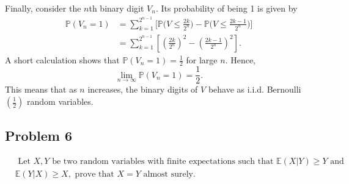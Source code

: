 \documentclass[letterpaper, 11pt]{article}
\newcommand{\1}{\mathds{1}}	%
\theoremstyle{definition}
\begin{document}
Finally, consider the \(n\)th binary digit \(V_n\). Its probability of being 1 is given by
\begin{align*}
\mathbb{P}(V_n=1)
  &= \sum_{k=1}^{2^{n-1}} \Bigg[\mathbb{P}\Big(V\le \frac{2k}{2^n}\Big)
     - \mathbb{P}\Big(V\le \frac{2k-1}{2^n}\Big)\Bigg] \\
  &= \sum_{k=1}^{2^{n-1}} \left[\left(\frac{2k}{2^n}\right)^2
     - \left(\frac{2k-1}{2^n}\right)^2\right].
\end{align*}
A short calculation shows that \(\mathbb{P}(V_n=1)=\frac{1}{2}\) for large \(n\). Hence,
\[
\lim_{n\to\infty}\mathbb{P}(V_n=1)=\frac{1}{2}.
\]
This means that as \(n\) increases, the binary digits of \(V\) behave as i.i.d. Bernoulli\(\left(\frac{1}{2}\right)\) random variables.

\subsection*{Problem 6}
\begin{align*}
    &\text{ Let $X,Y$ be two random variables with finite expectations such that $\mathbb{E}(X|Y) \geq Y$ and} \\
    &\mathbb{E}(Y|X) \geq X, \text{ prove that $X = Y$ almost surely.}
\end{align*}
\end{document}
